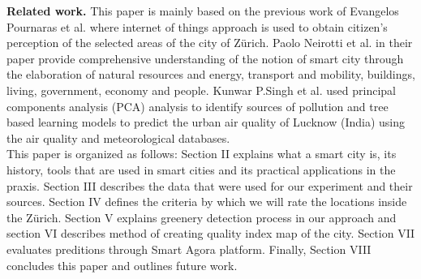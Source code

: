 \documentclass[letterpaper]{article}
\newcommand{\mypar}[1]{{\bf #1.}}
\begin{document}
\mypar{Related work} This paper is mainly based on the previous work of Evangelos Pournaras et al. \cite{smartCities}
where internet of things approach is used to obtain citizen's perception of the selected areas of the city of Zürich.
Paolo Neirotti et al. \cite{smartCities2} in their paper provide comprehensive understanding of the notion of smart city
through the elaboration of natural resources and energy, transport and mobility, buildings, living, government, economy
and people. Kunwar P.Singh et al. \cite{pollution} used principal components analysis (PCA) analysis to identify sources
of pollution and tree based learning models to predict the urban air quality of Lucknow (India) using the air quality
and meteorological databases.
\\
\indent This paper is organized as follows: Section II explains what a smart city is, its history, tools that are used
in smart cities and its practical applications in the praxis. Section III describes the data that were used for our
experiment and their sources. Section IV defines the criteria by which we will rate the locations inside the Zürich.
Section V explains greenery detection process in our approach and section VI describes method of creating quality index
map of the city. Section VII evaluates preditions through Smart Agora platform. Finally, Section VIII concludes this
paper and outlines future work.
\end{document}
